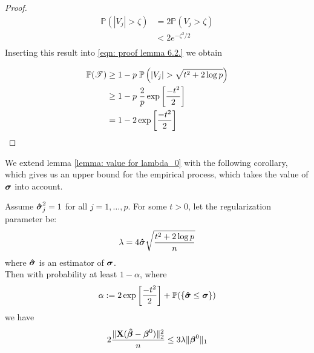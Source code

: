\begin{proof}
    \begin{align*}
        \mathbb{P} (|V_j| > \zeta) & = 2 \mathbb{P} (V_j > \zeta) \\
                                   & < 2 e^{-\zeta^2/2}           \\
    \end{align*}
    Inserting this result into \eqref{eqn: proof lemma 6.2.} we obtain

    \begin{align*}
        \mathbb{P}(\mathscr{T}) & \geq 1 - p \; \P \left( | V_{j} | > \sqrt{t^{2}+2 \log p}  \right) \\
                                & \geq 1 - p \; \frac{2}{p} \exp \left[ \frac{- t^{2}}{2} \right]    \\
                                & = 1 - 2 \exp \left[ \frac{- t^{2}}{2} \right]                      \\
    \end{align*}
\end{proof}
We extend lemma \ref{lemma: value for lambda_0} with the following corollary, which gives us an upper bound for the empirical process, which takes the value of \(\sgm\) into account.
\begin{corollary} %
    Assume $\sgmhat^2_j = 1$ for all \(j = 1, \ldots, p\). For some \(t > 0\), let the regularization parameter be:
    \[
        \lambda = 4 \sgmhat \sqrt{\frac{t^2 + 2 \log p}{n}}
    \]
    where $\sgmhat$ is an estimator of $\sgm$. \\
    Then with probability at least $1 - \alpha$, where
    \[
        \alpha := 2 \exp \left[ \frac{- t^{2}}{2} \right] + \P (\{\sgmhat \leq \sgm\})
    \]
    we have
    \[
        2 \frac{\| \X (\btahat - \bta^0)\|_2^2}{n} \leq 3 \lambda \| \bta^0 \|_1
    \]
\end{corollary}
